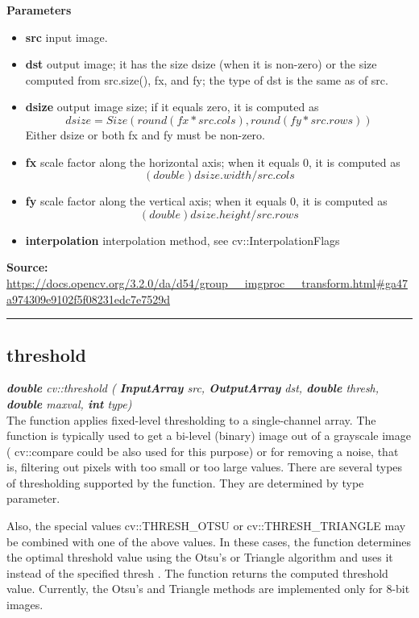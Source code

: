 \textbf{Parameters}
\begin{itemize}
    \item \textbf{src} input image.
    \item \textbf{dst} output image; it has the size dsize (when it is non-zero) or the size computed from src.size(), fx, and fy; the type of dst is the same as of src.
    \item \textbf{dsize} output image size; if it equals zero, it is computed as $$dsize = Size(round(fx*src.cols), round(fy*src.rows))$$
    Either dsize or both fx and fy must be non-zero.
    \item \textbf{fx} scale factor along the horizontal axis; when it equals 0, it is computed as $$(double)dsize.width/src.cols$$
    \item \textbf{fy}	scale factor along the vertical axis; when it equals 0, it is computed as $$(double)dsize.height/src.rows$$
    \item \textbf{interpolation}	interpolation method, see cv::InterpolationFlags
\end{itemize}
   
\textbf{Source:} \url{https://docs.opencv.org/3.2.0/da/d54/group__imgproc__transform.html#ga47a974309e9102f5f08231edc7e7529d}

\noindent\rule{\textwidth}{0.5pt}


\subsection*{threshold}
\label{subsec:opencv_annex_used_functions_threshold}

\textit{\textbf{double} cv::threshold (
        \textbf{InputArray} src,
		\textbf{OutputArray}  	dst,
		\textbf{double}  	thresh,
		\textbf{double}  	maxval,
		\textbf{int}  	type)}\\

The function applies fixed-level thresholding to a single-channel array. The function is typically used to get a bi-level (binary) image out of a grayscale image ( cv::compare could be also used for this purpose) or for removing a noise, that is, filtering out pixels with too small or too large values. There are several types of thresholding supported by the function. They are determined by type parameter.

Also, the special values cv::THRESH\_OTSU or cv::THRESH\_TRIANGLE may be combined with one of the above values. In these cases, the function determines the optimal threshold value using the Otsu's or Triangle algorithm and uses it instead of the specified thresh . The function returns the computed threshold value. Currently, the Otsu's and Triangle methods are implemented only for 8-bit images.\\

